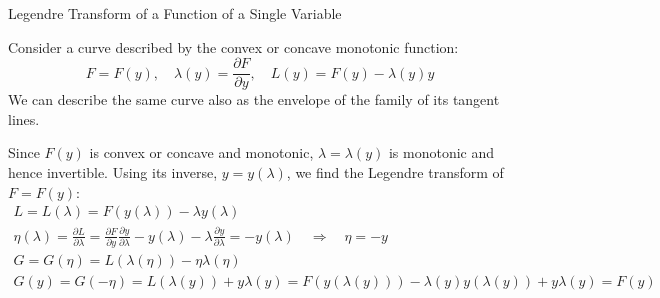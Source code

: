 \begin{thm}
    Legendre Transform of a Function of a Single Variable

Consider a curve described by the convex or concave monotonic function:
\[
F = F(y), \quad \lambda(y) = \frac{\partial F}{\partial y}, \quad L(y) = F(y) - \lambda(y)y
\]
We can describe the same curve also as the envelope of the family of its tangent lines.

Since \(F(y)\) is convex or concave and monotonic, 
\(\lambda = \lambda(y)\) is monotonic and hence invertible. 
Using its inverse, \(y = y(\lambda)\), we find the Legendre transform of \(F = F(y)\):
\begin{gather*}
    L = L(\lambda) = F(y(\lambda)) - \lambda y(\lambda)
    \\
    \eta(\lambda) = \frac{\partial L}{\partial \lambda} 
    = \frac{\partial F}{\partial y} \frac{\partial y}{\partial \lambda} 
    - y(\lambda) - \lambda \frac{\partial y}{\partial \lambda} 
    = -y(\lambda)\quad \Rightarrow\quad \eta = -y
    \\
    G = G(\eta) = L(\lambda(\eta)) - \eta \lambda(\eta)
    \\
    G(y) = G(-\eta) = L(\lambda(y)) + y \lambda(y) 
    = F(y(\lambda(y))) - \lambda(y) y(\lambda(y)) + y \lambda(y) = F(y)
\end{gather*}
\end{thm}

\label{eq.tex}

